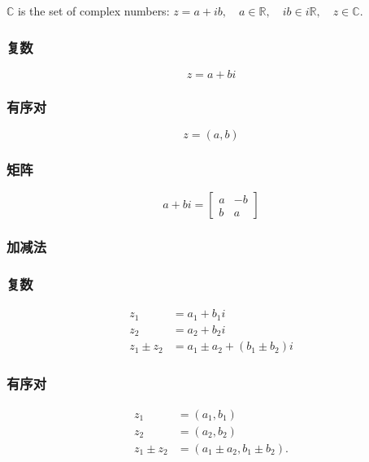 $\mathbb{C}$ is the set of complex numbers: $z=a+i b, \quad a \in \mathbb{R}, \quad i b \in i \mathbb{R}, \quad z \in \mathbb{C}$.

\subsubsection*{复数}
$$
z=a+b i
$$

\subsubsection*{有序对}
$$
z=(a, b)
$$

\subsubsection*{矩阵}

$$
a+b i=\left[\begin{array}{cc}
a & -b \\
b & a
\end{array}\right]
$$

\subsubsection{加减法}
\subsubsection*{复数}

$$
\begin{aligned}
z_{1} & =a_{1}+b_{1} i \\
z_{2} & =a_{2}+b_{2} i \\
z_{1} \pm z_{2} & =a_{1} \pm a_{2}+\left(b_{1} \pm b_{2}\right) i
\end{aligned}
$$

\subsubsection*{有序对}
$$
\begin{aligned}
z_{1} & =\left(a_{1}, b_{1}\right) \\
z_{2} & =\left(a_{2}, b_{2}\right) \\
z_{1} \pm z_{2} & =\left(a_{1} \pm a_{2}, b_{1} \pm b_{2}\right) .
\end{aligned}
$$

